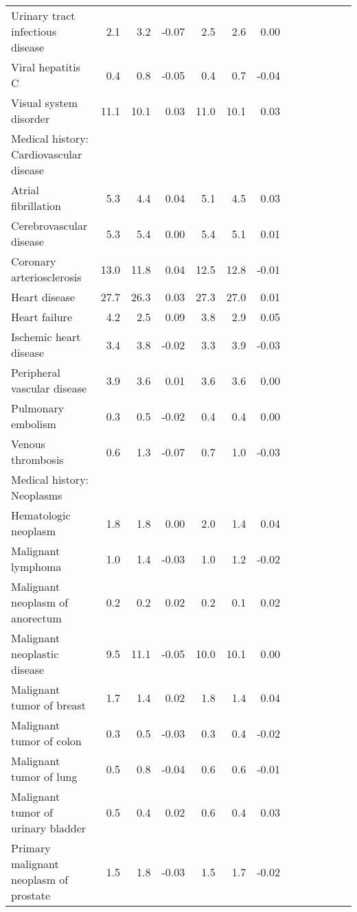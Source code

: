 \documentclass[11pt,]{article}
\begin{document}
\begin{longtable}{lrrrrrrrrrrrr}
      Urinary tract infectious disease &  2.1 &  3.2 & -0.07 &  2.5 &  2.6 &  0.00 \\ 
      Viral hepatitis C &  0.4 &  0.8 & -0.05 &  0.4 &  0.7 & -0.04 \\ 
      Visual system disorder & 11.1 & 10.1 &  0.03 & 11.0 & 10.1 &  0.03 \\ 
  Medical history: Cardiovascular disease &    &    &     &    &    &     \\ 
      Atrial fibrillation &  5.3 &  4.4 &  0.04 &  5.1 &  4.5 &  0.03 \\ 
      Cerebrovascular disease &  5.3 &  5.4 &  0.00 &  5.4 &  5.1 &  0.01 \\ 
      Coronary arteriosclerosis & 13.0 & 11.8 &  0.04 & 12.5 & 12.8 & -0.01 \\ 
      Heart disease & 27.7 & 26.3 &  0.03 & 27.3 & 27.0 &  0.01 \\ 
      Heart failure &  4.2 &  2.5 &  0.09 &  3.8 &  2.9 &  0.05 \\ 
      Ischemic heart disease &  3.4 &  3.8 & -0.02 &  3.3 &  3.9 & -0.03 \\ 
      Peripheral vascular disease &  3.9 &  3.6 &  0.01 &  3.6 &  3.6 &  0.00 \\ 
      Pulmonary embolism &  0.3 &  0.5 & -0.02 &  0.4 &  0.4 &  0.00 \\ 
      Venous thrombosis &  0.6 &  1.3 & -0.07 &  0.7 &  1.0 & -0.03 \\ 
  Medical history: Neoplasms &    &    &     &    &    &     \\ 
      Hematologic neoplasm &  1.8 &  1.8 &  0.00 &  2.0 &  1.4 &  0.04 \\ 
      Malignant lymphoma &  1.0 &  1.4 & -0.03 &  1.0 &  1.2 & -0.02 \\ 
      Malignant neoplasm of anorectum &  0.2 &  0.2 &  0.02 &  0.2 &  0.1 &  0.02 \\ 
      Malignant neoplastic disease &  9.5 & 11.1 & -0.05 & 10.0 & 10.1 &  0.00 \\ 
      Malignant tumor of breast &  1.7 &  1.4 &  0.02 &  1.8 &  1.4 &  0.04 \\ 
      Malignant tumor of colon &  0.3 &  0.5 & -0.03 &  0.3 &  0.4 & -0.02 \\ 
      Malignant tumor of lung &  0.5 &  0.8 & -0.04 &  0.6 &  0.6 & -0.01 \\ 
      Malignant tumor of urinary bladder &  0.5 &  0.4 &  0.02 &  0.6 &  0.4 &  0.03 \\ 
      Primary malignant neoplasm of prostate &  1.5 &  1.8 & -0.03 &  1.5 &  1.7 & -0.02 \\ 

\end{longtable}
\end{document}
